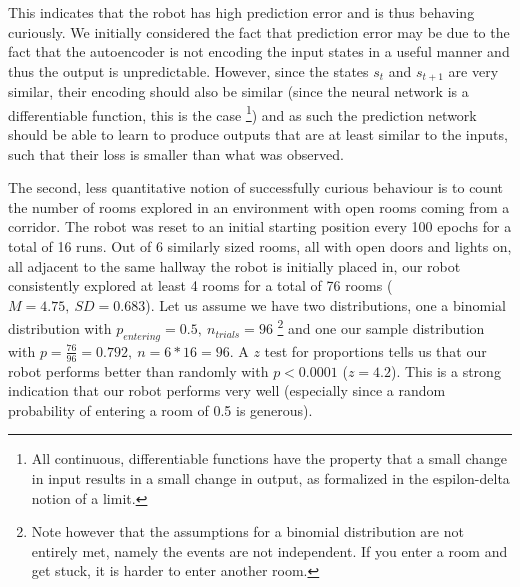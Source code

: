 \documentclass[conference, 12pt]{IEEEtran} %
\begin{document}
	\par This indicates that the robot has high prediction error and is thus behaving curiously. We initially considered the fact that prediction error may be due to the fact that the autoencoder is not encoding the input states in a useful manner and thus the output is unpredictable. However, since the states $s_t$ and $s_{t+1}$ are very similar, their encoding should also be similar (since the neural network is a differentiable function, this is the case \footnote{All continuous, differentiable functions have the property that a small change in input results in a small change in output, as formalized in the espilon-delta notion of a limit.}) and as such the prediction network should be able to learn to produce outputs that are at least similar to the inputs, such that their loss is smaller than what was observed.
	\par The second, less quantitative notion of successfully curious behaviour is to count the number of rooms explored in an environment with open rooms coming from a corridor. The robot was reset to an initial starting position every 100 epochs for a total of 16 runs. Out of 6 similarly sized rooms, all with open doors and lights on, all adjacent to the same hallway the robot is initially placed in, our robot consistently explored at least 4 rooms for a total of 76 rooms ($M = 4.75, \ SD = 0.683$). Let us assume we have two distributions, one a binomial distribution with $p_{entering} = 0.5, \ n_{trials} = 96$ \footnote{Note however that the assumptions for a binomial distribution are not entirely met, namely the events are not independent. If you enter a room and get stuck, it is harder to enter another room.} and one our sample distribution with $p = \frac{76}{96} = 0.792, \ n = 6*16 = 96 $. A $z$ test for proportions tells us that our robot performs better than randomly with $p < 0.0001$ ($z = 4.2$). This is a strong indication that our robot performs very well (especially since a random probability of entering a room of 0.5 is generous).
\end{document}
